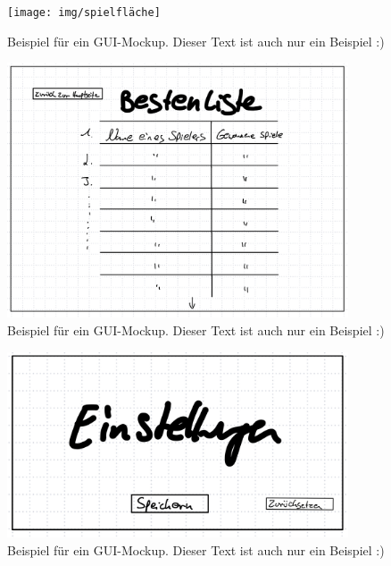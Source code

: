 \begin{figure}
	\centering
	\texttt{[image: img/spielfläche]}
	\caption{Beispiel für ein GUI-Mockup. Dieser Text ist auch nur ein Beispiel :)}
	\label{gui:spielfläche}
\end{figure}

\begin{figure}
	\centering
	\includegraphics[width=0.9\textwidth]{img/bestenliste}
	\caption{Beispiel für ein GUI-Mockup. Dieser Text ist auch nur ein Beispiel :)}
	\label{gui:bestenliste}
\end{figure}

\begin{figure}
	\centering
	\includegraphics[width=0.9\textwidth]{img/einstellungen}
	\caption{Beispiel für ein GUI-Mockup. Dieser Text ist auch nur ein Beispiel :)}
	\label{gui:einstellungen}
\end{figure}

